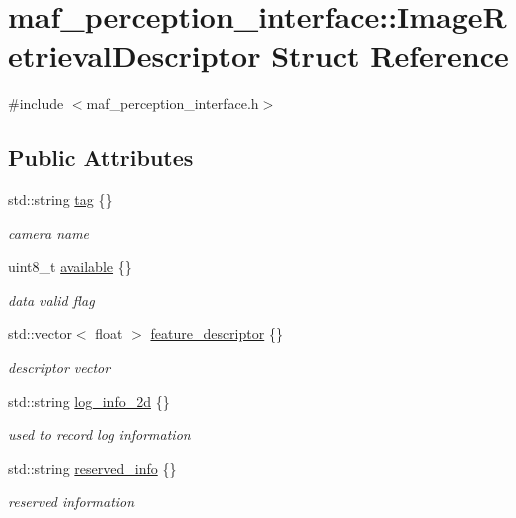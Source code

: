 \hypertarget{structmaf__perception__interface_1_1ImageRetrievalDescriptor}{}\section{maf\+\_\+perception\+\_\+interface\+:\+:Image\+Retrieval\+Descriptor Struct Reference}
\label{structmaf__perception__interface_1_1ImageRetrievalDescriptor}


{\ttfamily \#include $<$maf\+\_\+perception\+\_\+interface.\+h$>$}

\subsection*{Public Attributes}
\begin{DoxyCompactItemize}
\item 
std\+::string \hyperlink{structmaf__perception__interface_1_1ImageRetrievalDescriptor_abe3641007c0403288a08001dc83a8e7b}{tag} \{\}
\begin{DoxyCompactList}\small\item\em camera name \end{DoxyCompactList}\item 
uint8\+\_\+t \hyperlink{structmaf__perception__interface_1_1ImageRetrievalDescriptor_a3c2bccd185efe757980459e9a3605a2d}{available} \{\}
\begin{DoxyCompactList}\small\item\em data valid flag \end{DoxyCompactList}\item 
std\+::vector$<$ float $>$ \hyperlink{structmaf__perception__interface_1_1ImageRetrievalDescriptor_a9548d713f66012bc1289cd34c7bae350}{feature\+\_\+descriptor} \{\}
\begin{DoxyCompactList}\small\item\em descriptor vector \end{DoxyCompactList}\item 
std\+::string \hyperlink{structmaf__perception__interface_1_1ImageRetrievalDescriptor_ac25c22d489bf2bbcb98c2a0222579f00}{log\+\_\+info\+\_\+2d} \{\}
\begin{DoxyCompactList}\small\item\em used to record log information \end{DoxyCompactList}\item 
std\+::string \hyperlink{structmaf__perception__interface_1_1ImageRetrievalDescriptor_a7e1be4e84f5cb58ded4f1bcf4d05e517}{reserved\+\_\+info} \{\}
\begin{DoxyCompactList}\small\item\em reserved information \end{DoxyCompactList}\end{DoxyCompactItemize}


